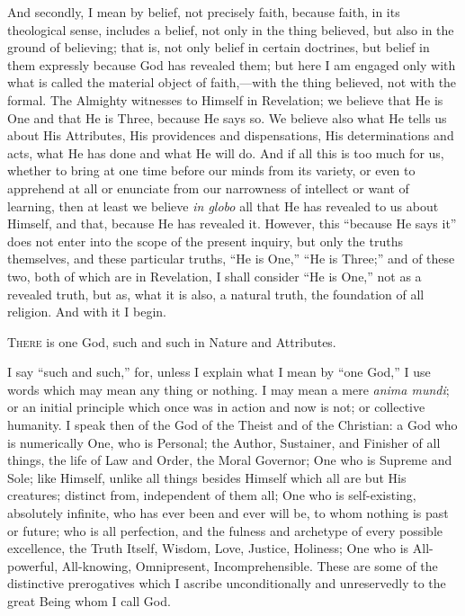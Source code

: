 And secondly, I mean by belief, not precisely faith, because faith,
in its theological sense, includes a belief, not only in the thing
believed, but also in the ground of believing; that is, not only
belief in certain doctrines, but belief in them expressly because God
has revealed them; but here I am engaged only with what is
called the material object of faith,—with the thing believed, not
with the formal. The Almighty witnesses to Himself in Revelation; we
believe that He is One and that He is Three, because He says so. We
believe also what He tells us about His Attributes, His providences
and dispensations, His determinations and acts, what He has done and
what He will do. And if all this is too much for us, whether to bring
at one time before our minds from its variety, or even to apprehend at
all or enunciate from our narrowness of intellect or want of learning,
then at least we believe \emph{in globo} all that He has revealed to
us about Himself, and that, because He has revealed it. However, this
``because He says it'' does not enter into the scope of the
present inquiry, but only the truths themselves, and these particular
truths, ``He is One,'' ``He is Three;'' and of these
two, both of which are in Revelation, I shall consider ``He is
One,'' not as a revealed truth, but as, what it is also, a natural
truth, the foundation of all religion. And with it I begin.


T\textsc{here} is one God, such and such in Nature and Attributes.

I say ``such and such,'' for, unless I explain what I mean
by ``one God,'' I use words which may mean any thing or
nothing. I may mean a mere \emph{anima mundi}; or an initial principle
which once was in action and now is not; or collective humanity. I
speak then of the God of the Theist and of the Christian: a God who is
numerically One, who is Personal; the Author, Sustainer, and Finisher
of all things, the life of Law and Order, the Moral Governor; One who
is Supreme and Sole; like Himself, unlike all things besides Himself
which all are but His creatures; distinct from, independent of them
all; One who is self-existing, absolutely infinite, who has ever been
and ever will be, to whom nothing is past or future; who is all
perfection, and the fulness and archetype of every possible
excellence, the Truth Itself, Wisdom, Love, Justice, Holiness; One who
is All-powerful, All-knowing, Omnipresent, Incomprehensible. These are
some of the distinctive prerogatives which I ascribe unconditionally
and unreservedly to the great Being whom I call God.

